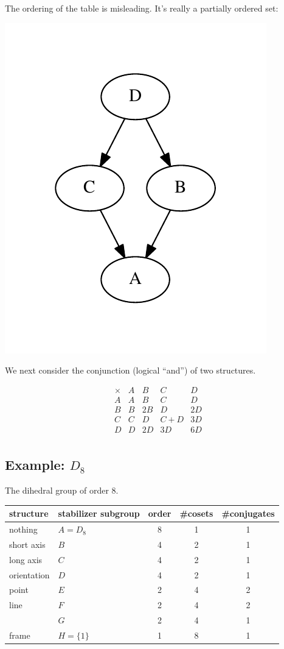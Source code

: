 \documentclass[11pt,oneside]{article}
\newcommand{\thinplus}{\!+\!}
\begin{document}
The ordering of the table is misleading.
It's really a partially ordered set:
\begin{center}
\includegraphics[width=0.3\columnwidth]{subgroups_s3.pdf} 
\end{center}

We next consider the conjunction (logical ``and'')
of two structures.


$$
\begin{array}{r|rrrr}
\times & A & B & C & D \\
\hline
A & A & B & C & D \\
B & B & 2B & D & 2D \\
C & C & D & C\thinplus D & 3D \\
D & D & 2D & 3D & 6D \\
\end{array}
$$

\subsection{Example: $D_8$}

The dihedral group of order 8.

\begin{samepage}
\begin{center}
\begin{tabular}{ |l|l|c|c|c| }
\hline
structure & stabilizer subgroup & order & \#cosets & \#conjugates \\
\hline
\hline
nothing & $A=D_8$ &       8        &  1      &   1         \\
\hline
short axis& $B$ &       4        &  2      &   1         \\
\hline
long axis & $C$ &       4        &  2      &   1         \\
\hline
orientation & $D$ &       4        &  2      &   1         \\
\hline
point & $E$ &       2        &  4      &   2         \\
\hline
line  & $F$ &       2        &  4      &   2         \\
\hline
        & $G$ &       2        &  4      &   1         \\
\hline
frame & $H=\{1\} $ &       1        &  8      &   1         \\
\hline
\end{tabular}
\end{center}
\end{samepage}
\end{document}
